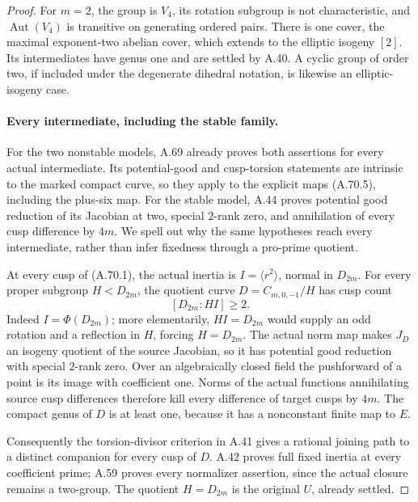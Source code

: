 \begin{proof}
For \(m=2\), the group is \(V_4\), its rotation subgroup is
not characteristic, and \(\operatorname{Aut}(V_4)\) is transitive
on generating ordered pairs. There is one cover, the maximal
exponent-two abelian cover, which extends to the elliptic
isogeny \([2]\). Its intermediates have genus one and are
settled by A.40. A cyclic group of order two, if included under
the degenerate dihedral notation, is likewise an elliptic-isogeny
case.

\paragraph{Every intermediate, including the stable family.}
For the two nonstable models, A.69 already proves both assertions
for every actual intermediate. Its potential-good and cusp-torsion
statements are intrinsic to the marked compact curve, so they
apply to the explicit maps (A.70.5), including the plus-six map.
For the stable model, A.44 proves potential good reduction of its
Jacobian at two, special \(2\)-rank zero, and annihilation of
every cusp difference by \(4m\). We spell out why the same
hypotheses reach every intermediate, rather than infer fixedness
through a pro-prime quotient.

At every cusp of (A.70.1), the actual inertia is
\(I=\langle r^2\rangle\), normal in \(D_{2m}\).
For every proper subgroup \(H<D_{2m}\), the quotient curve
\(D=C_{m,0,-1}/H\) has cusp count
\[
                   [D_{2m}:HI]\ge2.              \tag{A.70.12}
\]
Indeed \(I=\Phi(D_{2m})\); more elementarily, \(HI=D_{2m}\)
would supply an odd rotation and a reflection in \(H\), forcing
\(H=D_{2m}\). The actual norm map makes \(J_D\) an isogeny
quotient of the source Jacobian, so it has potential good
reduction with special \(2\)-rank zero. Over an algebraically
closed field the pushforward of a point is its image with
coefficient one. Norms of the actual functions annihilating
source cusp differences therefore kill every difference of
target cusps by \(4m\). The compact genus of \(D\) is at least
one, because it has a nonconstant finite map to \(E\).

Consequently the torsion-divisor criterion in A.41 gives a
rational joining path to a distinct companion for every cusp
of \(D\). A.42 proves full fixed inertia at every coefficient
prime; A.59 proves every normalizer assertion, since the actual
closure remains a two-group. The quotient \(H=D_{2m}\) is the
original \(U\), already settled.


\end{proof}
